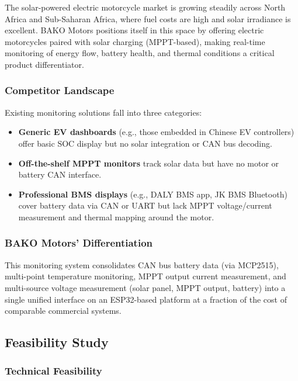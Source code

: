 The solar-powered electric motorcycle market is growing steadily across North Africa and Sub-Saharan Africa, where fuel costs are high and solar irradiance is excellent. BAKO Motors positions itself in this space by offering electric motorcycles paired with solar charging (MPPT-based), making real-time monitoring of energy flow, battery health, and thermal conditions a critical product differentiator.

\subsubsection*{Competitor Landscape}

Existing monitoring solutions fall into three categories:

\begin{itemize}
    \item \textbf{Generic EV dashboards} (e.g., those embedded in Chinese EV controllers) offer basic SOC display but no solar integration or CAN bus decoding.
    \item \textbf{Off-the-shelf MPPT monitors} track solar data but have no motor or battery CAN interface.
    \item \textbf{Professional BMS displays} (e.g., DALY BMS app, JK BMS Bluetooth) cover battery data via CAN or UART but lack MPPT voltage/current measurement and thermal mapping around the motor.
\end{itemize}

\subsubsection*{BAKO Motors' Differentiation}

This monitoring system consolidates CAN bus battery data (via MCP2515), multi-point temperature monitoring, MPPT output current measurement, and multi-source voltage measurement (solar panel, MPPT output, battery) into a single unified interface on an ESP32-based platform at a fraction of the cost of comparable commercial systems.

\subsection{Feasibility Study}

\subsubsection*{Technical Feasibility}

